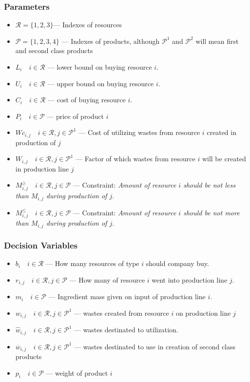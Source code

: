 \subsubsection*{Parameters}
\begin{itemize}
    \item $\mathcal{R} = \{ 1, 2, 3\}$--- Indexes of resources
    \item $\mathcal{P} = \{ 1, 2, 3, 4 \}$ --- Indexes of products, although $\mathcal{P}^1$ and $\mathcal{P}^2$ will mean first and second class products
    \item $L_{i} \quad i \in \mathcal{R}$ --- lower bound on buying resource $i$.
    \item $U_{i} \quad i \in \mathcal{R}$ --- upper bound on buying resource $i$. 
    \item $C_{i} \quad i \in \mathcal{R}$ --- cost of buying resource $i$.
    \item $P_{i} \quad i \in \mathcal{P}$ --- price of product $i$
    \item $Wc_{i, j} \quad i \in \mathcal{R}, j \in \mathcal{P}^1$ --- Cost of utilizing wastes from resource $i$ created in production of $j$
    \item $W_{i,j} \quad i \in \mathcal{R}, j \in \mathcal{P}^1$ --- Factor of which wastes from resource $i$ will be created in production line $j$
    \item $M^{\geqslant}_{i,j} \quad i \in \mathcal{R}, j \in \mathcal{P}$ --- Constraint: \textit{Amount of resource $i$ should be not less than $M_{i,j}$ during production of $j$}.
    \item $M^{\leqslant}_{i,j} \quad i \in \mathcal{R}, j \in \mathcal{P}$ --- Constraint: \textit{Amount of resource $i$ should be not more than $M_{i,j}$ during production of $j$}.

\end{itemize}
\subsubsection*{Decision Variables}
\begin{itemize}
    \item $b_{i} \quad i \in \mathcal{R}$ --- How many resources of type $i$ should company buy.
    \item $r_{i,j} \quad i \in \mathcal{R}, j \in \mathcal{P}$ --- How many of resource $i$ went into production line $j$.
    \item $m_{i} \quad i \in \mathcal{P}$ --- Ingredient mass given on input of production line $i$.
    \item $w_{i, j} \quad i \in \mathcal{R}, j \in \mathcal{P}^1$ --- wastes created from resource $i$ on production line $j$
    \item $\hat{w}_{i, j} \quad i \in \mathcal{R}, j \in \mathcal{P}^1$ --- wastes destinated to utilization.
    \item $\overline{w}_{i, j} \quad i \in \mathcal{R}, j \in \mathcal{P}^1$ --- wastes destinated to use in creation of second class products
    \item $p_i \quad i \in \mathcal{P}$ --- weight of product $i$ 
\end{itemize}

